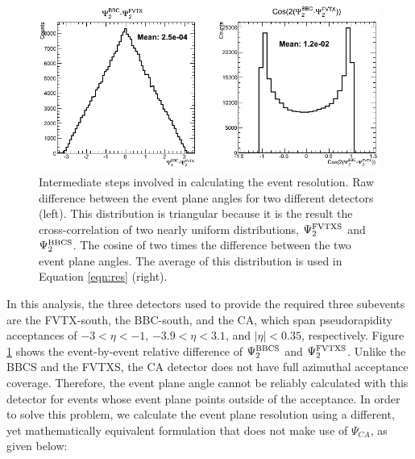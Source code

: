 \begin{figure}[!h]
\begin{center}
\includegraphics[width=0.75\linewidth]{figs/resolution_intermediate_calc.png}
\caption{Intermediate steps involved in calculating the event resolution. Raw difference between the event plane angles for two different detectors (left). This distribution is triangular because it is the result the cross-correlation of two nearly uniform distributions, $\Psi_2^{\rm FVTXS}$ and $\Psi_2^{\rm BBCS}$. The cosine of two times the difference between the two event plane angles. The average of this distribution is used in Equation \ref{eqn:res} (right).}
\label{fig:fvtx_ew_default}
\end{center}
\end{figure}

In this analysis, the three detectors used to provide the required three subevents are the FVTX-south, the BBC-south, and the CA, which span pseudorapidity acceptances of $-3 <\eta < -1$, $-3.9 < \eta < 3.1$, and $|\eta| < 0.35$, respectively. Figure \ref{fig:fvtx_ew_default} shows the event-by-event relative difference of $\Psi_2^{\rm BBCS}$ and $\Psi_2^{\rm FVTXS}$. Unlike the BBCS and the FVTXS, the CA detector does not have full azimuthal acceptance coverage. Therefore, the event plane angle cannot be reliably calculated with this detector for events whose event plane points outside of the acceptance. In order to solve this problem, we calculate the event plane resolution using a different, yet mathematically equivalent formulation that does not make use of $\Psi_{CA}$, as given below:

